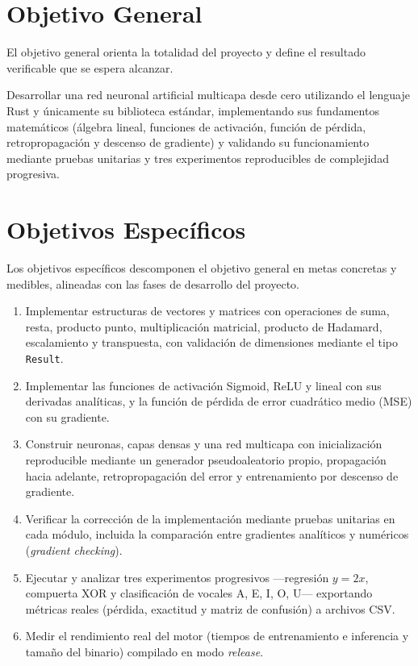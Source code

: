 \chapter{Objetivo General}\label{cap:objgeneral}
El objetivo general orienta la totalidad del proyecto y define el resultado verificable que se espera alcanzar.

\begin{nota}
Desarrollar una red neuronal artificial multicapa desde cero utilizando el lenguaje Rust y únicamente su biblioteca estándar, implementando sus fundamentos matemáticos (álgebra lineal, funciones de activación, función de pérdida, retropropagación y descenso de gradiente) y validando su funcionamiento mediante pruebas unitarias y tres experimentos reproducibles de complejidad progresiva.
\end{nota}

\chapter{Objetivos Específicos}\label{cap:objespecificos}
Los objetivos específicos descomponen el objetivo general en metas concretas y medibles, alineadas con las fases de desarrollo del proyecto.

\begin{enumerate}[label=\textbf{OE\arabic*.},leftmargin=3.2em,itemsep=4pt]
\item Implementar estructuras de vectores y matrices con operaciones de suma, resta, producto punto, multiplicación matricial, producto de Hadamard, escalamiento y transpuesta, con validación de dimensiones mediante el tipo \texttt{Result}.
\item Implementar las funciones de activación Sigmoid, ReLU y lineal con sus derivadas analíticas, y la función de pérdida de error cuadrático medio (MSE) con su gradiente.
\item Construir neuronas, capas densas y una red multicapa con inicialización reproducible mediante un generador pseudoaleatorio propio, propagación hacia adelante, retropropagación del error y entrenamiento por descenso de gradiente.
\item Verificar la corrección de la implementación mediante pruebas unitarias en cada módulo, incluida la comparación entre gradientes analíticos y numéricos (\emph{gradient checking}).
\item Ejecutar y analizar tres experimentos progresivos ---regresión $y=2x$, compuerta XOR y clasificación de vocales A, E, I, O, U--- exportando métricas reales (pérdida, exactitud y matriz de confusión) a archivos CSV.
\item Medir el rendimiento real del motor (tiempos de entrenamiento e inferencia y tamaño del binario) compilado en modo \emph{release}.
\end{enumerate}
